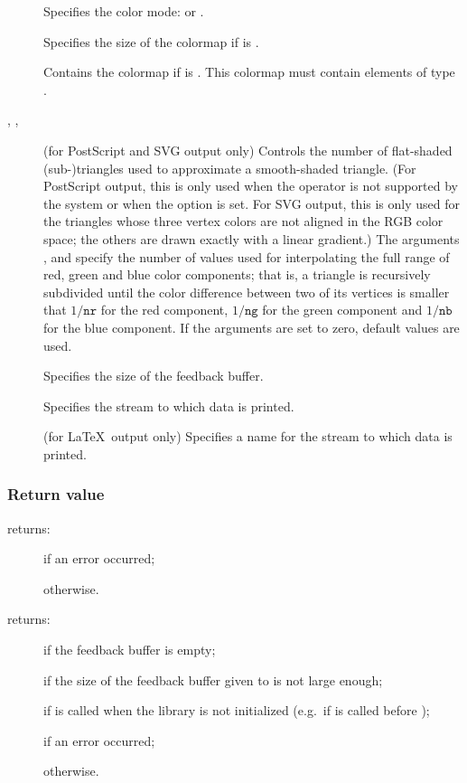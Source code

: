 \begin{description}
\item[] Specifies the color mode:  or
  .
\item[] Specifies the size of the colormap if 
  is .
\item[] Contains the colormap if  is
  . This colormap must contain  elements of
  type .
\item[, , ] (for PostScript and SVG output only)
  Controls the number of flat-shaded \mbox{(sub-)triangles} used to
  approximate a smooth-shaded triangle. (For PostScript output, this
  is only used when the  operator is not supported by the
  system or when the  option is set. For SVG
  output, this is only used for the triangles whose three vertex colors are
  not aligned in the RGB color space; the others are drawn exactly with a
  linear gradient.)  The
  arguments ,  and  specify the number of values
  used for interpolating the full range of red, green and blue color
  components; that is, a triangle is recursively subdivided until the
  color difference between two of its vertices is smaller that
  $1/\mathtt{nr}$ for the red component, $1/\mathtt{ng}$ for the green
  component and $1/\mathtt{nb}$ for the blue component. If the
  arguments are set to zero, default values are used.
\item[] Specifies the size of the feedback buffer.
\item[] Specifies the stream to which data is printed.
\item[] (for \LaTeX\ output only) Specifies a name for
  the stream to which data is printed.
\end{description}

\subsubsection{Return value}

\noindent{} returns:
\begin{description}
\item[] if an error occurred;
\item[] otherwise.
\end{description}

\noindent{} returns:
\begin{description}
\item[] if the feedback buffer is empty;
\item[] if the size of the feedback buffer given to
 is not large enough;
\item[] if  is called when the
library is not initialized (e.g.\ if  is called before
);
\item[] if an error occurred;
\item[] otherwise.
\end{description}

